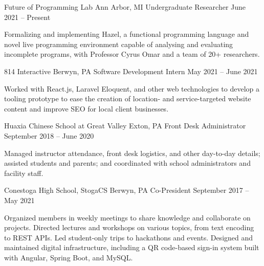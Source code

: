 \documentclass[letterpaper,11pt]{article}
\begin{document}
  \begin{rsectionlist}
    \rsectionitem
      {Future of Programming Lab}
      {Ann Arbor, MI}
      {Undergraduate Researcher}
      {June 2021 -- Present}
      
      Formalizing and implementing Hazel, a functional programming language and novel live
      programming environment capable of analysing and evaluating incomplete programs, with
      Professor Cyrus Omar and a team of 20+ researchers.

      \begin{rpointlist}
      \end{rpointlist}

    \rsectionitem
      {814 Interactive}
      {Berwyn, PA}
      {Software Development Intern}
      {May 2021 -- June 2021}

      Worked with React.js, Laravel Eloquent, and other web technologies to develop a tooling
      prototype to ease the creation of location- and service-targeted website content and improve
      SEO for local client businesses.

    \rsectionitem
      {Huaxia Chinese School at Great Valley}
      {Exton, PA}
      {Front Desk Administrator}
      {September 2018 -- June 2020}

      Managed instructor attendance, front desk logistics, and other day-to-day details; assisted
      students and parents; and coordinated with school administrators and facility staff.

    \rsectionitem
      {Conestoga High School, StogaCS}
      {Berwyn, PA}
      {Co-President}
      {September 2017 -- May 2021}

      Organized members in weekly meetings to share knowledge and collaborate on projects. Directed
      lectures and workshops on various topics, from text encoding to REST APIs. Led student-only
      trips to hackathons and events. Designed and maintained digital infrastructure, including a QR
      code-based sign-in system built with Angular, Spring Boot, and MySQL.
  \end{rsectionlist}
\end{document}
